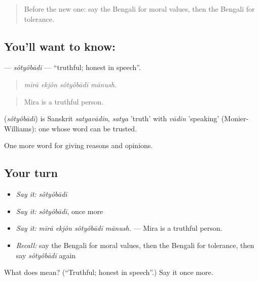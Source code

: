 \begin{quote}
Before the new one: say the Bengali for moral values, then the Bengali for tolerance.
\end{quote}

\subsection*{You'll want to know: }
\textbf{} — \emph{sôtyôbādī} — \textquotedblleft{}truthful; honest in speech\textquotedblright{}.

\begin{quote}
   
\end{quote}

\begin{quote}
\emph{mīrā ekjôn sôtyôbādī mānush.}
\end{quote}

\begin{quote}
Mira is a truthful person.
\end{quote}

\begin{cousinweb}
\textbf{} (\emph{sôtyôbādī}) is Sanskrit \emph{satyavādin}, \emph{satya} 'truth' with \emph{vādin} 'speaking' (Monier-Williams): one whose word can be trusted.
\end{cousinweb}

\begin{grammarlens}[title={What you've built}]
One more word for giving reasons and opinions.
\end{grammarlens}

\subsection*{Your turn}
\begin{itemize}
\raggedright
  \item \emph{Say it:} \emph{sôtyôbādī}
  \item \emph{Say it:} \emph{sôtyôbādī}, once more
  \item \emph{Say it:} \emph{mīrā ekjôn sôtyôbādī mānush.} — Mira is a truthful person.
  \item \emph{Recall:} say the Bengali for moral values, then the Bengali for tolerance, then say \emph{sôtyôbādī} again
\end{itemize}

\begin{tcolorbox}[breakable,colback=teal!4,colframe=teal!35!black,title={Before you move on}]
What does  mean? (\textquotedblleft{}Truthful; honest in speech\textquotedblright{}.) Say it once more.
\end{tcolorbox}
